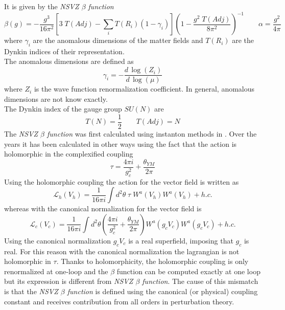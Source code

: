 It is given by the \emph{NSVZ $\beta$ function} 
\begin{equation}
  \beta (g) = - \frac{g^3}{16 \pi^2} \left[ 3 \; T(Adj) - \sum_i T( R_i) ( 1 - \gamma_i ) \right]  \left( 1 - \frac{ g^2 \; T(Adj)  }{8 \pi^2} \right)^{-1} \qquad \alpha = \frac{g^2}{4 \pi}
\label{beta-exact}
\end{equation} 
where $\gamma_i$ are the anomalous dimensions of the matter fields and $T(R_i)$ are the Dynkin indices of their representation.\\
The anomalous dimensions are defined as
\begin{equation}
 \gamma_i = - \frac{d \, \log(Z_i) }{d \, \log( \mu)}
\end{equation}
where $Z_i$ is the wave function renormalization coefficient. In general, anomalous dimensions are not know exactly.\\
The Dynkin index of the gauge group $SU(N)$ are 
\begin{equation}
 T(N) = \frac{1}{2} \qquad T(Adj) = N 
\label{eqn:suN_Dynkin_indices}
\end{equation}
The \emph{NSVZ $\beta$ function} was first calculated using instanton methods in \cite{Novikov:1985rd}. 
Over the years it has been calculated in other ways using the fact that the action is holomorphic in the complexified coupling
\begin{equation}
	 \tau = \frac{4 \pi i }{g_c^2 } + \frac{\theta_{YM}}{2 \pi} 
\end{equation}
Using the holomorphic coupling the action for the vector field is written as
\begin{equation}
 \mathcal{L}_h ( V_h) = \frac{1}{16 \pi i } \int d^2 \theta \; \tau \; W^a ( V_h) W^a(V_h)  + h.c.
\end{equation}
whereas with the canonical normalization for the vector field is
\begin{equation}
 \mathcal{L}_c ( V_c) = \frac{1}{16 \pi i } \int d^2 \theta \left( \frac{4 \pi i }{g_c^2 } + \frac{\theta_{YM}}{2 \pi} \right) W^a ( g_c V_c) W^a(g_c V_c) + h. c.  
\end{equation}
Using the canonical normalization $g_c V_c$ is a real superfield, imposing that $g_c$ is real.
For this reason with the canonical normalization the lagrangian is not holomorphic in $\tau$.
Thanks to holomorphicity, the holomorphic coupling is only renormalized at one-loop and the $\beta$ function can be computed exactly at one loop but its expression is different from \emph{NSVZ $\beta$ function}.
The cause of this mismatch is that the \emph{NSVZ $\beta$ function} is defined using the canonical (or physical) coupling constant and receives contribution from all orders in perturbation theory.

